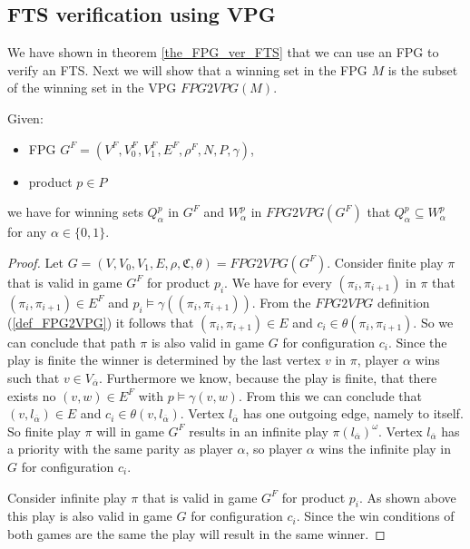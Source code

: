 \subsection{FTS verification using VPG}
We have shown in theorem \ref{the_FPG_ver_FTS} that we can use an FPG to verify an FTS. Next we will show that a winning set in the FPG $M$ is the subset of the winning set in the VPG $\textit{FPG2VPG}(M)$.
\begin{theorem}
	\label{the_FPG_sub_VPG}
	Given:
	\begin{itemize}
		\item FPG $G^F = (V^F, V_0^F, V_1^F, E^F, \rho^F, N, P, \gamma)$,
		\item product $p \in P$
	\end{itemize}
	we have for winning sets $Q_\alpha^{p}$ in $G^F$ and $W_\alpha^{p}$ in $\textit{FPG2VPG}(G^F)$ that $Q_\alpha^{p} \subseteq W_\alpha^{p}$ for any $\alpha \in \{0,1\}$.
	\begin{proof}
		Let $G = (V,V_0,V_1, E, \rho, \mathfrak{C},\theta) = \textit{FPG2VPG}(G^F)$. Consider finite play $\pi$ that is valid in game $G^F$ for product $p_i$. We have for every $(\pi_i, \pi_{i+1})$ in $\pi$ that $(\pi_i, \pi_{i+1}) \in E^F$ and $p_i \models \gamma((\pi_i, \pi_{i+1}))$. From the $\textit{FPG2VPG}$ definition (\ref{def_FPG2VPG}) it follows that $(\pi_i, \pi_{i+1}) \in E$ and $c_i \in \theta(\pi_i, \pi_{i+1})$. So we can conclude that path $\pi$ is also valid in game $G$ for configuration $c_i$. Since the play is finite the winner is determined by the last vertex $v$ in $\pi$, player $\alpha$ wins such that $v \in V_{\overline{\alpha}}$. Furthermore we know, because the play is finite, that there exists no $(v,w) \in E^F$ with $p \models \gamma(v,w)$. From this we can conclude that $(v, l_{\overline{\alpha}}) \in E$ and $c_i \in \theta(v, l_{\overline{\alpha}})$. Vertex $l_{\overline{\alpha}}$ has one outgoing edge, namely to itself. So finite play $\pi$ will in game $G^F$ results in an infinite play $\pi(l_{\overline{\alpha}})^\omega$. Vertex $l_{\overline{\alpha}}$ has a priority with the same parity as player $\alpha$, so player $\alpha$ wins the infinite play in $G$ for configuration $c_i$.
		
		Consider infinite play $\pi$ that is valid in game $G^F$ for product $p_i$. As shown above this play is also valid in game $G$ for configuration $c_i$. Since the win conditions of both games are the same the play will result in the same winner.
		

\end{proof}
\end{theorem}
